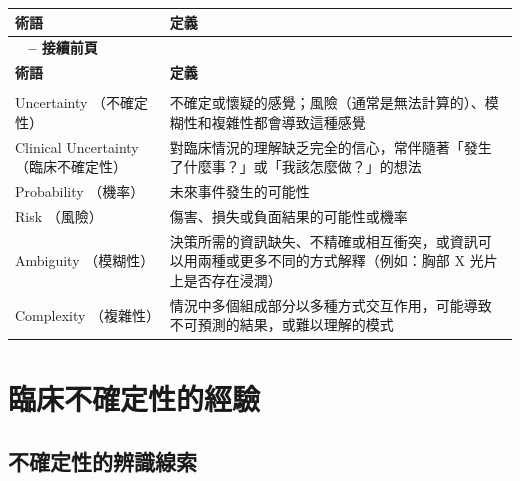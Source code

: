 \documentclass[12pt,a4paper]{article}
\begin{document}
\begin{longtable}{>{\raggedright\arraybackslash}p{4cm} >{\raggedright\arraybackslash}p{11cm}}
\toprule
\textbf{\textcolor{emergency_red}{術語}} & \textbf{\textcolor{emergency_red}{定義}} \\
\midrule
\endfirsthead

\multicolumn{2}{c}%
{{\bfseries \tablename\ \thetable{} -- 接續前頁}} \\
\toprule
\textbf{\textcolor{emergency_red}{術語}} & \textbf{\textcolor{emergency_red}{定義}} \\
\midrule
\endhead

\midrule \multicolumn{2}{r}{{接續下頁}} \\ \midrule
\endfoot

\bottomrule
\endlastfoot

Uncertainty \newline （不確定性） & 不確定或懷疑的感覺；風險（通常是無法計算的）、模糊性和複雜性都會導致這種感覺 \\

Clinical Uncertainty \newline （臨床不確定性） & 對臨床情況的理解缺乏完全的信心，常伴隨著「發生了什麼事？」或「我該怎麼做？」的想法 \\

Probability \newline （機率） & 未來事件發生的可能性 \\

Risk \newline （風險） & 傷害、損失或負面結果的可能性或機率 \\

Ambiguity \newline （模糊性） & 決策所需的資訊缺失、不精確或相互衝突，或資訊可以用兩種或更多不同的方式解釋（例如：胸部 X 光片上是否存在浸潤） \\

Complexity \newline （複雜性） & 情況中多個組成部分以多種方式交互作用，可能導致不可預測的結果，或難以理解的模式 \\
\end{longtable}

\section{臨床不確定性的經驗}

\subsection{不確定性的辨識線索}
\end{document}
